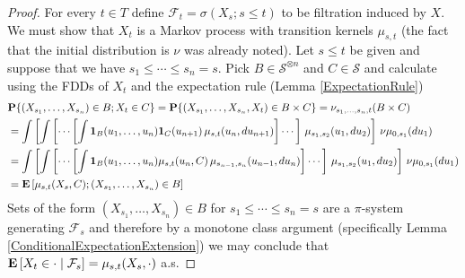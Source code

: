 \begin{proof}
For every $t \in T$ define $\mathcal{F}_t = \sigma(X_s ; s \leq t)$ to
be filtration induced by $X$.  We must show that $X_t$ is a Markov process with transition
kernels $\mu_{s,t}$ (the fact that the initial distribution is $\nu$
was already noted).  Let $s \leq t$ be given and suppose that we have
$s_1 \leq \dotsb \leq s_n = s$.  Pick $B \in \mathcal{S}^{\otimes n}$
and $C \in \mathcal{S}$ and calculate using the FDDs of $X_t$ and the
expectation rule (Lemma \ref{ExpectationRule})
\begin{align*}
&\probability{(X_{s_1}, \dotsc, X_{s_n}) \in B ; X_t \in C}  = \probability{(X_{s_1}, \dotsc, X_{s_n}, X_t) \in B \times C} =
\nu_{s_1, \dotsc, s_n, t}(B \times C) \\
&=\int \left [ \int \left[ \dotsb \left [ \int \characteristic{B}(u_1,
    \dotsc, u_n) \characteristic{C}(u_{n+1})\, \mu_{s,t}(u_{n}, du_{n+1}) \right] \dotsb
\right] \, \mu_{s_1, s_2}(u_1, du_2) \right ] \, \nu \mu_{0,
s_1}(du_1) \\
&=\int \left [ \int \left[ \dotsb \left [ \int \characteristic{B}(u_1,
    \dotsc, u_n) \mu_{s,t}(u_{n}, C)\, \mu_{s_{n-1},s_n}(u_{n-1}, du_{n}) \right] \dotsb
\right] \, \mu_{s_1, s_2}(u_1, du_2) \right ] \, \nu \mu_{0,
s_1}(du_1) \\
&=\expectation{\mu_{s,t}(X_s, C) ; (X_{s_1}, \dotsc, X_{s_n}) \in B}
\end{align*}
Sets of the form $(X_{s_1}, \dotsc, X_{s_n}) \in B$ for $s_1 \leq
\dotsb \leq s_n=s$ are a $\pi$-system generating $\mathcal{F}_s$ and
therefore by a monotone class argument (specifically Lemma \ref{ConditionalExpectationExtension}) we may
conclude that $\cexpectationlong{\mathcal{F}_s}{X_t \in \cdot} =
\mu_{s,t}(X_s, \cdot)$ a.s.
\end{proof}

